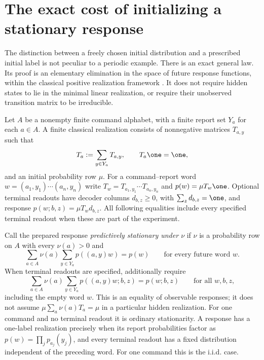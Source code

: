 \section{The exact cost of initializing a stationary response}
\label{sec:r75-stationary-initialization}

The distinction between a freely chosen initial distribution and a
prescribed initial label is not peculiar to a periodic example.  There is
an exact general law.  Its proof is an elementary elimination in the
space of future response functions, within the classical positive
realization framework \cite{Heller65,MonrasWinter14,MonrasWinter16}.  It does not require
hidden states to lie in the minimal linear realization, or require their
unobserved transition matrix to be irreducible.

Let $A$ be a nonempty finite command alphabet, with a finite report set
$Y_a$ for each $a\in A$.  A finite classical realization consists of
nonnegative matrices $T_{a,y}$ such that
\[
 T_a:=\sum_{y\in Y_a}T_{a,y},\qquad T_a\one=\one,
\]
and an initial probability row $\mu$.  For a command--report word
$w=(a_1,y_1)\cdots(a_n,y_n)$ write
$T_w=T_{a_1,y_1}\cdots T_{a_n,y_n}$ and
$p(w)=\mu T_w\one$.  Optional terminal readouts have decoder
columns $d_{b,z}\ge0$, with $\sum_zd_{b,z}=\one$, and response
$p(w;b,z)=\mu T_wd_{b,z}$.  All following equalities include every specified
terminal readout when these are part of the experiment.

Call the prepared response \emph{predictively stationary under $\nu$}
if $\nu$ is a probability row on $A$ with every $\nu(a)>0$ and
\begin{equation}\label{eq:r75-predictive-stationarity}
 \sum_{a\in A}\nu(a)\sum_{y\in Y_a}p((a,y)w)=p(w)
 \qquad\text{for every future word }w.
\end{equation}
When terminal readouts are specified, additionally require
\begin{equation}\label{eq:r75-terminal-stationarity}
 \sum_{a\in A}\nu(a)\sum_{y\in Y_a}p((a,y)w;b,z)=p(w;b,z)
 \qquad\text{for all }w,b,z,
\end{equation}
including the empty word $w$.
This is an equality of observable responses; it does not assume
$\mu\sum_a\nu(a)T_a=\mu$ in a particular hidden realization.  For one
command and no terminal readout it is ordinary stationarity.  A response
has a one-label realization precisely when its report probabilities
factor as $p(w)=\prod_jp_{a_j}(y_j)$, and every terminal readout has a
fixed distribution independent of the preceding word.  For one command
this is the i.i.d. case.

